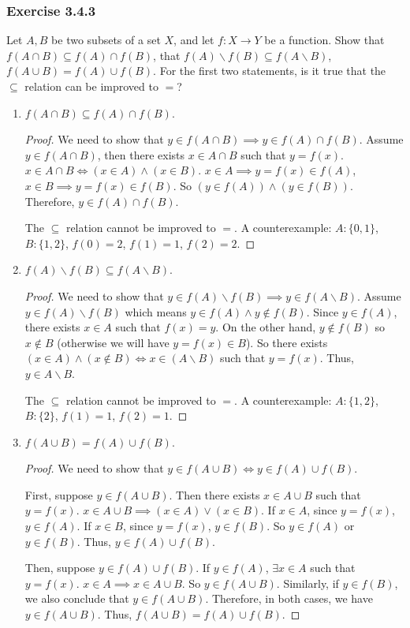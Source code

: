 \documentclass[12pt, letter]{article}
\begin{document}
\subsubsection*{Exercise 3.4.3}
Let $A,B$ be two subsets of a set $X$, and let $f:X\to Y$ be a function. Show that $f(A\cap B)\subseteq f(A)\cap f(B)$, that $f(A)\backslash f(B)\subseteq f(A\backslash B)$, $f(A\cup B)=f(A)\cup f(B)$. For the first two statements, is it true 
that the $\subseteq$ relation can be improved to $=$?
\begin{enumerate}
    \item $f(A\cap B)\subseteq f(A)\cap f(B)$.
    \begin{proof}
        We need to show that $y\in f(A\cap B)\implies y\in f(A)\cap f(B)$. Assume $y\in f(A\cap B)$, then there exists $x\in A\cap B$ such that $y=f(x)$. $x\in A\cap B\iff (x\in A)\land(x\in B)$. $x\in A\implies y=f(x)\in f(A)$, $x\in B\implies y=f(x)\in f(B)$. 
        So $(y\in f(A))\land(y\in f(B))$. Therefore, $y\in f(A)\cap f(B)$.

        The $\subseteq$ relation cannot be improved to $=$. A counterexample: $A:\{0,1\}$, $B:\{1,2\}$, $f(0)=2$, $f(1)=1$, $f(2)=2$.
    \end{proof}
    \item $f(A)\backslash f(B)\subseteq f(A\backslash B)$.
    \begin{proof}
        We need to show that $y\in f(A)\backslash f(B)\implies y\in f(A\backslash B)$. Assume $y\in f(A)\backslash f(B)$ which means $y\in f(A)\land y\notin f(B)$. Since $y\in f(A)$, there exists $x\in A$ such that $f(x)=y$. 
        On the other hand, $y\notin f(B)$ so $x\notin B$ (otherwise we will have $y=f(x)\in B$). So there exists $(x\in A)\land (x\notin B) \iff x\in (A\backslash B)$ such that $y=f(x)$. Thus, $y\in A\backslash B$.

        The $\subseteq$ relation cannot be improved to $=$. A counterexample: $A:\{1,2\}$, $B:\{2\}$, $f(1)=1$, $f(2)=1$.
    \end{proof}
    \item $f(A\cup B)=f(A)\cup f(B)$.
    \begin{proof}
        We need to show that $y\in f(A\cup B)\iff y\in f(A)\cup f(B)$. 
        
        First, suppose $y\in f(A\cup B)$. Then there exists $x\in A\cup B$ such that $y=f(x)$. $x\in A\cup B\implies (x\in A)\lor (x\in B)$. If $x\in A$, since $y=f(x)$, $y\in f(A)$. If $x\in B$, since $y=f(x)$, $y\in f(B)$.
        So $y\in f(A)$ or $y\in f(B)$. Thus, $y\in f(A)\cup f(B)$. 

        Then, suppose $y\in f(A)\cup f(B)$. If $y\in f(A)$, $\exists x\in A$ such that $y=f(x)$. $x\in A\implies x\in A\cup B$. So $y\in f(A\cup B)$. Similarly, if $y\in f(B)$, we also conclude that $y\in f(A\cup B)$. Therefore, in both cases, we have $y\in f(A\cup B)$.
        Thus, $f(A\cup B)=f(A)\cup f(B)$.
    \end{proof}
\end{enumerate}
\end{document}
